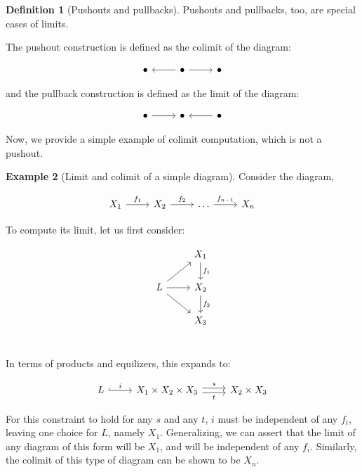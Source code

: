 \documentclass[10pt]{amsart}
\newcommand{\8}{\ensuremath{\infty}}
\newcommand{\0}{\ensuremath{\overset{\rightarrow}{0}}}
\newcommand{\1}{\ensuremath{\mathbf{1}}}
\theoremstyle{definition}
\newtheorem{definition}{Definition}[section]
\newtheorem{example}[definition]{Example}
\numberwithin{definition}{subsection}
\numberwithin{definition}{section}
\begin{document}
\begin{definition}[Pushouts and pullbacks]
  Pushouts and pullbacks, too, are special cases of limits.

  The pushout construction is defined as the colimit of the diagram:

  \begin{equation*}
    \begin{tikzcd}
      \bullet & \bullet \arrow[l] \arrow[r] & \bullet
    \end{tikzcd}
  \end{equation*}

  and the pullback construction is defined as the limit of the diagram:

  \begin{equation*}
    \begin{tikzcd}
      \bullet \arrow[r] & \bullet & \bullet \arrow[l]
    \end{tikzcd}
  \end{equation*}
\end{definition}

Now, we provide a simple example of colimit computation, which is not a pushout.

\begin{example}[Limit and colimit of a simple diagram]
  Consider the diagram,

  \begin{equation*}
    \begin{tikzcd}
      X_1 \arrow[r, "f_1"] & X_2 \arrow[r, "f_2"] & \ldots \arrow[r, "f_{n - 1}"] & X_n
    \end{tikzcd}
  \end{equation*}

  To compute its limit, let us first consider:

  \begin{equation*}
    \begin{tikzcd}
      & X_1 \arrow[d, "f_1"] \\
      L \arrow[ur] \arrow[r] \arrow[dr] & X_2 \arrow[d, "f_2"] \\
      & X_3 \\
    \end{tikzcd}
  \end{equation*}

  In terms of products and equilizers, this expands to:

  \begin{equation*}
    \begin{tikzcd}
      L \arrow[r, hookrightarrow, "i"] & X_1 \times X_2 \times X_3 \arrow[r, shift left, "s"] \arrow[r, shift right, "t"'] & X_2 \times X_3
    \end{tikzcd}
  \end{equation*}

  For this constraint to hold for any $s$ and any $t$, $i$ must be independent of any $f_i$, leaving one choice for $L$, namely $X_1$. Generalizing, we can assert that the limit of any diagram of this form will be $X_1$, and will be independent of any $f_i$. Similarly, the colimit of this type of diagram can be shown to be $X_n$.
\end{example}
\end{document}
